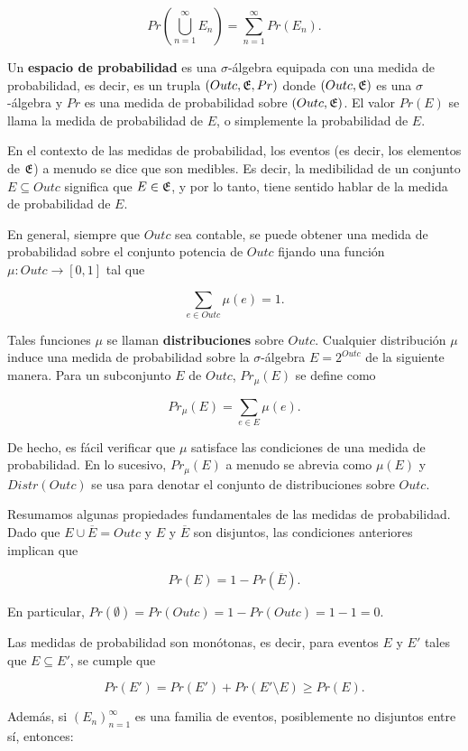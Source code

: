 \[
	Pr\left(\bigcup_{n=1}^{\infty} E_n\right) = \sum_{n=1}^{\infty} Pr(E_n).
\]

Un \textbf{espacio de probabilidad} es una \(\sigma\)-álgebra equipada con una
medida de probabilidad, es decir, es un trupla \((Outc, \mathfrak{E}, Pr)\) donde
\((Outc, \mathfrak{E})\) es una \(\sigma\)-álgebra y \(Pr\) es una medida de
probabilidad sobre \((Outc, \mathfrak{E})\). El valor \(Pr(E)\) se llama la medida
de probabilidad de \(E\), o simplemente la probabilidad de \(E\).

En el contexto de las medidas de probabilidad, los eventos (es decir, los
elementos de \(\mathfrak{E}\)) a menudo se dice que son medibles. Es decir, la
medibilidad de un conjunto \(E \subseteq Outc\) significa que \(E \in
\mathfrak{E}\), y por lo tanto, tiene sentido hablar de la medida de probabilidad de
\(E\).

En general, siempre que \(Outc\) sea contable, se puede obtener una medida de
probabilidad sobre el conjunto potencia de \(Outc\) fijando una función \(\mu :
Outc \to [0, 1]\) tal que

\[
	\sum_{e \in Outc} \mu(e) = 1.
\]

Tales funciones \(\mu\) se llaman \textbf{distribuciones} sobre \(Outc\).
Cualquier distribución \(\mu\) induce una medida de probabilidad sobre la
\(\sigma\)-álgebra \(E = 2^{Outc}\) de la siguiente manera. Para un subconjunto
\(E\) de \(Outc\), \(Pr_\mu(E)\) se define como

\[
	Pr_\mu(E) = \sum_{e \in E} \mu(e).
\]

De hecho, es fácil verificar que \(\mu\) satisface las condiciones de una
medida de probabilidad. En lo sucesivo, \(Pr_\mu(E)\) a menudo se abrevia como
\(\mu(E)\) y \(Distr(Outc)\) se usa para denotar el conjunto de distribuciones
sobre \(Outc\).

Resumamos algunas propiedades fundamentales de las medidas de probabilidad.
Dado que \(E \cup \overline{E} = Outc\) y \(E\) y \(\overline{E}\) son
disjuntos, las condiciones anteriores implican que

\[
	Pr(E) = 1 - Pr(\overline{E}).
\]

En particular, \(Pr(\emptyset) = Pr(Outc) = 1 - Pr(Outc) = 1 - 1 = 0\).

Las medidas de probabilidad son monótonas, es decir, para eventos \(E\) y
\(E'\) tales que \(E \subseteq E'\), se cumple que

\[
	Pr(E') = Pr(E') + Pr(E' \setminus E) \geq Pr(E).
\]

Además, si \((E_n)_{n=1}^{\infty}\) es una familia de eventos, posiblemente no
disjuntos entre sí, entonces:

